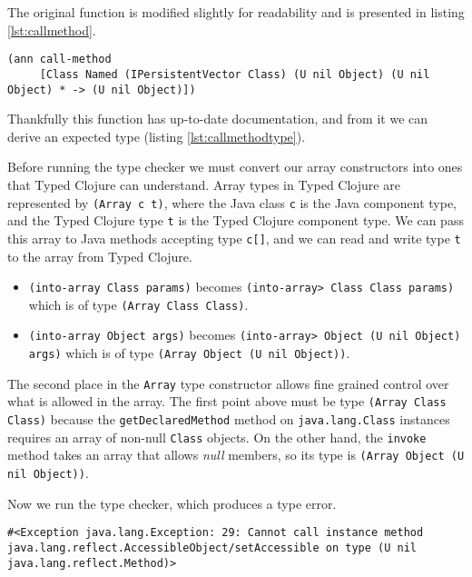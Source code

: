 The original function is modified slightly for readability and is presented in listing \ref{lst:callmethod}.

\begin{lstlisting}[caption=call-method Type Annotation, label=lst:callmethodtype]
(ann call-method 
     [Class Named (IPersistentVector Class) (U nil Object) (U nil Object) * -> (U nil Object)])
\end{lstlisting}

Thankfully this function has up-to-date documentation, and from it we can derive an expected type
(listing \ref{lst:callmethodtype}).

Before running the type checker we must convert our array constructors into ones that Typed Clojure
can understand. Array types in Typed Clojure are represented by \lstinline|(Array c t)|, where
the Java class \lstinline|c| is the Java component type,
and the Typed Clojure type \lstinline|t| is the Typed Clojure component type. 
We can pass this array to Java methods accepting
type \lstinline|c[]|, and we can read and write type \lstinline|t| to the array from Typed Clojure.

\begin{itemize}
\item \lstinline|(into-array Class params)| becomes \lstinline|(into-array> Class Class params)|
      which is of type \lstinline|(Array Class Class)|.
\item \lstinline|(into-array Object args)| becomes \lstinline|(into-array> Object (U nil Object) args)|
      which is of type \lstinline|(Array Object (U nil Object))|.
\end{itemize}

The second place in the \lstinline|Array| type constructor allows fine grained control over what is allowed
in the array. The first point above must be type \lstinline|(Array Class Class)| because the 
\lstinline|getDeclaredMethod| method on \lstinline|java.lang.Class| instances requires an array of non-null
\lstinline|Class| objects. On the other hand, the \lstinline|invoke| method takes an array that allows
\emph{null} members, so its type is \lstinline|(Array Object (U nil Object))|.

Now we run the type checker, which produces a type error.

\begin{lstlisting}
#<Exception java.lang.Exception: 29: Cannot call instance method java.lang.reflect.AccessibleObject/setAccessible on type (U nil java.lang.reflect.Method)>
\end{lstlisting}

